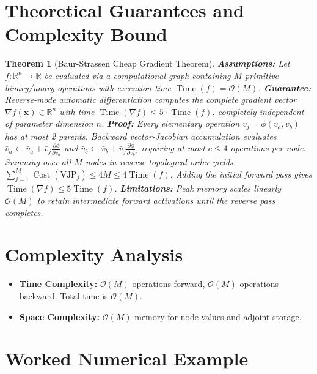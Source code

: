 \documentclass[11pt]{article}
\newtheorem{theorem}{Theorem}
\begin{document}
\section{Theoretical Guarantees and Complexity Bound}
\label{sec:guarantees}

\begin{theorem}[Baur-Strassen Cheap Gradient Theorem]
\label{thm:baur_strassen_full}
\textbf{Assumptions:} Let $f: \mathbb{R}^n \to \mathbb{R}$ be evaluated via a computational graph containing $M$ primitive binary/unary operations with execution time $\operatorname{Time}(f) = \mathcal{O}(M)$.
\textbf{Guarantee:} Reverse-mode automatic differentiation computes the complete gradient vector $\nabla f(\mathbf{x}) \in \mathbb{R}^n$ with time $\operatorname{Time}(\nabla f) \le 5 \cdot \operatorname{Time}(f)$, completely independent of parameter dimension $n$.
\textbf{Proof:}
Every elementary operation $v_j = \phi(v_a, v_b)$ has at most 2 parents. Backward vector-Jacobian accumulation evaluates $\bar{v}_a \gets \bar{v}_a + \bar{v}_j \frac{\partial \phi}{\partial v_a}$ and $\bar{v}_b \gets \bar{v}_b + \bar{v}_j \frac{\partial \phi}{\partial v_b}$, requiring at most $c \le 4$ operations per node. Summing over all $M$ nodes in reverse topological order yields $\sum_{j=1}^M \operatorname{Cost}(\text{VJP}_j) \le 4M \le 4 \operatorname{Time}(f)$. Adding the initial forward pass gives $\operatorname{Time}(\nabla f) \le 5 \operatorname{Time}(f)$.
\textbf{Limitations:} Peak memory scales linearly $\mathcal{O}(M)$ to retain intermediate forward activations until the reverse pass completes.
\end{theorem}

\section{Complexity Analysis}
\label{sec:complexity}

\begin{itemize}
    \item \textbf{Time Complexity:} $\mathcal{O}(M)$ operations forward, $\mathcal{O}(M)$ operations backward. Total time is $\mathcal{O}(M)$.
    \item \textbf{Space Complexity:} $\mathcal{O}(M)$ memory for node values and adjoint storage.
\end{itemize}

\section{Worked Numerical Example}
\label{sec:worked_example}
\end{document}
